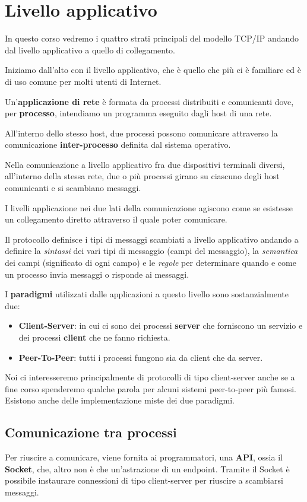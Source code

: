 \chapter{Livello applicativo}
In questo corso vedremo i quattro strati principali del modello 
TCP/IP andando dal livello applicativo a quello di collegamento. 

Iniziamo dall'alto con il livello applicativo, che è quello che
più ci è familiare ed è di uso comune per molti utenti di Internet.

Un'\textbf{applicazione di rete} è formata da processi distribuiti e 
comunicanti dove, per \textbf{processo}, intendiamo un programma 
eseguito dagli host di una rete.

All'interno dello stesso host, due processi possono comunicare 
attraverso la comunicazione \textbf{inter-processo} definita dal 
sistema operativo.

Nella comunicazione a livello applicativo fra due dispositivi terminali
diversi, all'interno della stessa rete, due o più processi girano su 
ciascuno degli host comunicanti e si scambiano messaggi.

I livelli applicazione nei due lati della comunicazione agiscono come 
se esistesse un collegamento diretto attraverso il quale poter 
comunicare.

Il protocollo definisce i tipi di messaggi scambiati a livello 
applicativo andando a definire la \emph{sintassi} dei vari tipi di 
messaggio (campi del messaggio), la \emph{semantica} dei campi 
(significato di ogni campo) e le \emph{regole} per determinare quando 
e come un processo invia messaggi o risponde ai messaggi.

I \textbf{paradigmi} utilizzati dalle applicazioni a questo livello
sono sostanzialmente due:
\begin{itemize}
	\item \textbf{Client-Server}: in cui ci sono dei processi 
		\textbf{server} che forniscono un servizio e dei processi 
		\textbf{client} che ne fanno richiesta.
	\item \textbf{Peer-To-Peer}: tutti i processi fungono sia da 
		client che da server.
\end{itemize}
Noi ci interesseremo principalmente di protocolli di tipo client-server
anche se a fine corso spenderemo qualche parola per alcuni sistemi
peer-to-peer più famosi. Esistono anche delle implementazione miste 
dei due paradigmi.

\section{Comunicazione tra processi}
Per riuscire a comunicare, viene fornita ai programmatori, una
\textbf{API}, ossia il \textbf{Socket}, che, altro non è che
un'astrazione di un endpoint. Tramite il Socket è possibile instaurare 
connessioni di tipo client-server per riuscire a scambiarsi messaggi.

